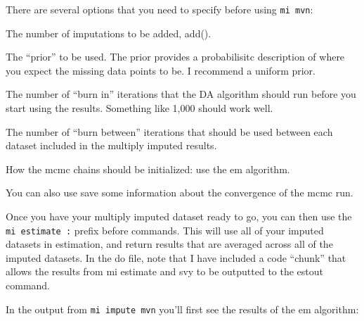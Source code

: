 \documentclass[12 pt]{article}
\begin{document}
There are several options that you need to specify before using
\texttt{mi mvn}:

\begin{description}
  \item The number of imputations to be added, add(). 


    \item The ``prior'' to be used. The prior provides a probabilisitc
      description of where you expect the missing data points to be. I
      recommend a uniform prior. 


    \item The number of ``burn in'' iterations that the DA algorithm
      should run before you start using the results. Something like
      1,000 should work well. 


    \item The number of ``burn between'' iterations that should be
      used between each dataset included in the multiply imputed
      results. 


      \item How the mcmc chains should be initialized: use the em
        algorithm. 


        \item You can also use save some information about the
          convergence of the mcmc run. 
\end{description}

Once you have your multiply imputed dataset ready to go, you can then
use the \texttt{mi estimate :} prefix before commands.  This will use
all of your imputed datasets in estimation, and return results that
are averaged across all of the imputed datasets. In the do file, note
that I have included a code ``chunk'' that allows the results from mi
estimate and svy to be outputted to the estout command. 

In the output from \texttt{mi impute mvn} you'll first see the results
of the em algorithm:
\end{document}
